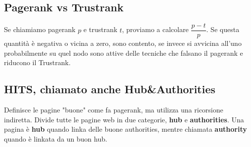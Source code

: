 \documentclass[\main/main.tex]{subfiles}
\begin{document}
\subsection{Pagerank vs Trustrank}
Se chiamiamo pagerank $p$ e trustrank $t$, proviamo a calcolare $\dfrac{p-t}{p}$. Se questa quantità è negativa o vicina a zero, sono contento, se invece si avvicina all'uno probabilmente su quel nodo sono attive delle tecniche che falsano il pagerank e riducono il Trustrank.

\subsection{HITS, chiamato anche Hub\&Authorities}
Definisce le pagine "buone" come fa pagerank, ma utilizza una ricorsione indiretta. Divide tutte le pagine web in due categorie, \textbf{hub} e \textbf{authorities}. Una pagina è \textbf{hub} quando linka delle buone authorities, mentre chiamata \textbf{authority} quando è linkata da un buon hub.
\end{document}
